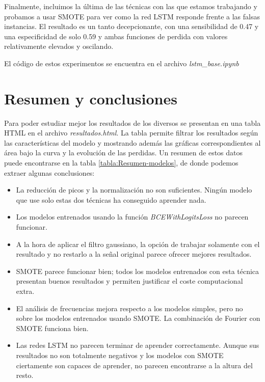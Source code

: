 Finalmente, incluimos la última de las técnicas con las que estamos trabajando y probamos a usar SMOTE para ver como la red LSTM responde frente a las falsas instancias. El resultado es un tanto decepcionante, con una sensibilidad de 0.47 y una especificidad de solo 0.59 y ambas funciones de perdida con valores relativamente elevados y oscilando. 

El código de estos experimentos se encuentra en el archivo \textit{lstm\_base.ipynb}

\section{Resumen y conclusiones}

Para poder estudiar mejor los resultados de los diversos se presentan en una tabla HTML en el archivo \textit{resultados.html}. La tabla permite filtrar los resultados según las características del modelo y mostrando además las gráficas correspondientes al área bajo la curva y la evolución de las perdidas. Un resumen de estos datos puede encontrarse en la tabla  \ref{tabla:Resumen-modelos}, de donde podemos extraer algunas conclusiones:

\begin{itemize}
    \item La reducción de picos y la normalización no son suficientes. Ningún modelo que use solo estas dos técnicas ha conseguido aprender nada.
    \item Los modelos entrenados usando la función \textit{BCEWithLogitsLoss} no parecen funcionar.
    \item A la hora de aplicar el filtro gaussiano, la opción de trabajar solamente con el resultado y no restarlo a la señal original parece ofrecer mejores resultados.
    \item SMOTE parece funcionar bien; todos los modelos entrenados con esta técnica presentan buenos resultados y permiten justificar el coste computacional extra.
    \item El análisis de frecuencias mejora respecto a los modelos simples, pero no sobre los modelos entrenados usando SMOTE. La combinación de Fourier con SMOTE funciona bien.
    \item Las redes LSTM no parecen terminar de aprender correctamente. Aunque sus resultados no son totalmente negativos y los modelos con SMOTE ciertamente son capaces de aprender, no parecen encontrarse a la altura del resto.
\end{itemize}

